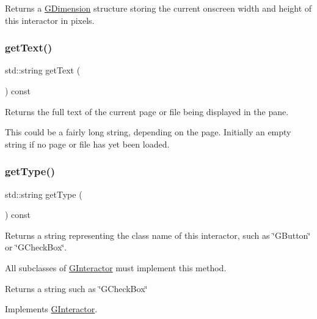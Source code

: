 Returns a \mbox{\hyperlink{classGDimension}{G\+Dimension}} structure storing the current onscreen width and height of this interactor in pixels. 

\mbox{\label{classGBrowserPane_aff553c50924b836c29f146ed34a7c6ec}} 
\subsubsection{\texorpdfstring{get\+Text()}{getText()}}
{\footnotesize\ttfamily std\+::string get\+Text (\begin{DoxyParamCaption}{ }\end{DoxyParamCaption}) const\hspace{0.3cm}{\ttfamily [virtual]}}



Returns the full text of the current page or file being displayed in the pane. 

This could be a fairly long string, depending on the page. Initially an empty string if no page or file has yet been loaded. \mbox{\label{classGBrowserPane_a9896d58fcfebbf1025aeeb5b8b9ede80}} 
\subsubsection{\texorpdfstring{get\+Type()}{getType()}}
{\footnotesize\ttfamily std\+::string get\+Type (\begin{DoxyParamCaption}{ }\end{DoxyParamCaption}) const\hspace{0.3cm}{\ttfamily [virtual]}}



Returns a string representing the class name of this interactor, such as \char`\"{}\+G\+Button\char`\"{} or \char`\"{}\+G\+Check\+Box\char`\"{}. 

All subclasses of \mbox{\hyperlink{classGInteractor}{G\+Interactor}} must implement this method. \begin{DoxyReturn}{Returns}
a string such as \char`\"{}\+G\+Check\+Box\char`\"{} 
\end{DoxyReturn}


Implements \mbox{\hyperlink{classGInteractor_a799e073a127b428cc841086d42ea4fed}{G\+Interactor}}.

